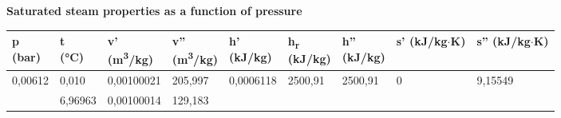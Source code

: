 \begin{center}
    \textbf{ Saturated steam properties as a function of pressure }
\end{center}
\vspace{0.2cm} %

\begin{longtable}{|>{\raggedleft\arraybackslash}p{1.2cm}|>{\raggedleft\arraybackslash}p{1.5cm}|>{\raggedleft\arraybackslash}p{1.8cm}|>{\raggedleft\arraybackslash}p{1.8cm}|>{\raggedleft\arraybackslash}p{1.5cm}|
>{\raggedleft\arraybackslash}p{1.5cm}|>{\raggedleft\arraybackslash}p{1.5cm}|>{\raggedleft\arraybackslash}p{1.5cm}|>{\raggedleft\arraybackslash}p{1.5cm}|}
\hline
\small \makecell{\textbf{p} \\ (bar)} & \small \makecell{\textbf{t} \\ (°C)} 
& \small \makecell{\textbf{v'} \\ (m\textsuperscript{3}/kg)} & \small \makecell{\textbf{v''} \\ (m\textsuperscript{3}/kg)} 
& \small \makecell{\textbf{h'} \\ (kJ/kg)} & \small \makecell{\textbf{h\textsubscript{r}} \\ (kJ/kg)} & \small \makecell{\textbf{h''} \\ (kJ/kg)} 
& \small \makecell{\textbf{s'} \\ (kJ/kg$\cdot$K)} & \small \makecell{\textbf{s''} \\ (kJ/kg$\cdot$K)} \\
\hline
\endfirsthead

\hline
\hline
\endhead

\hline
\endfoot

\hline
\endlastfoot



0,00612 & 

0,010 & 

0,00100021 & 

205,997 & 

0,0006118 & 

2500,91 & 

2500,91 & 

0 & 

9,15549
 \\


0.01 & 

6,96963 & 

0,00100014 & 

129,183 & 


\end{longtable}
